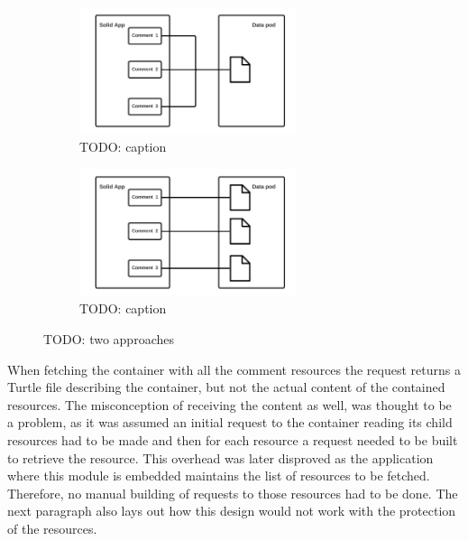 \begin{figure}
    \centering
    \begin{subfigure}{.5\textwidth}
      \centering
      \includegraphics[width=0.7\textwidth]{prototype/graphs/poc-comment-single-resource-comments.png}
      \caption{TODO: caption}
      \label{fig:ppc-comment-single-resource-comments}
    \end{subfigure}%
    \begin{subfigure}{.5\textwidth}
      \centering
      \includegraphics[width=0.7\textwidth]{prototype/graphs/poc-comment-multiple-resources-comments.png}
      \caption{TODO: caption}
      \label{fig:poc-comment-multiple-resources-comments}
    \end{subfigure}
    \caption{TODO: two approaches}
    \label{fig:test}
\end{figure}

When fetching the container with all the comment resources the request returns a Turtle file describing the container, but not the actual content of the contained resources. The misconception of receiving the content as well, was thought to be a problem, as it was assumed an initial request to the container reading its child resources had to be made and then for each resource a request needed to be built to retrieve the resource. This overhead was later disproved as the application where this module is embedded maintains the list of resources to be fetched. Therefore, no manual building of requests to those resources had to be done. The next paragraph also lays out how this design would not work with the protection of the resources.

